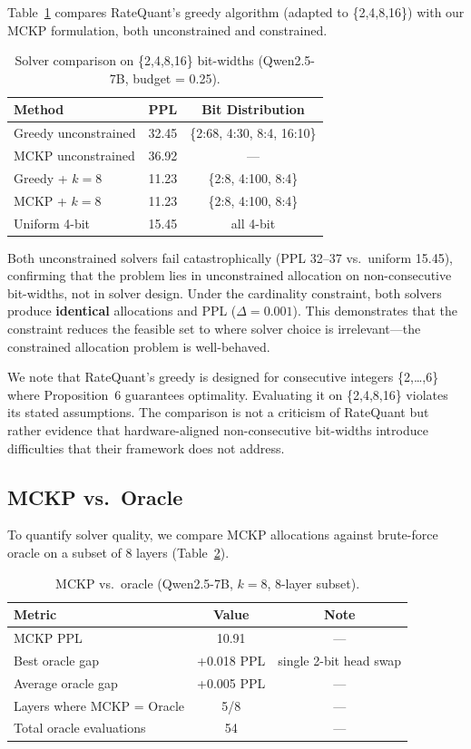 \documentclass[11pt,a4paper]{article}
\begin{document}
Table~\ref{tab:solver} compares RateQuant's greedy algorithm (adapted to \{2,4,8,16\}) with our MCKP formulation, both unconstrained and constrained.

\begin{table}[h]
\centering
\caption{Solver comparison on \{2,4,8,16\} bit-widths (Qwen2.5-7B, budget = 0.25).}
\label{tab:solver}
\small
\begin{tabular}{lcc}
\toprule
Method & PPL & Bit Distribution \\
\midrule
Greedy unconstrained & 32.45 & \{2:68, 4:30, 8:4, 16:10\} \\
MCKP unconstrained & 36.92 & --- \\
\midrule
Greedy + $k\!=\!8$ & 11.23 & \{2:8, 4:100, 8:4\} \\
MCKP + $k\!=\!8$ & 11.23 & \{2:8, 4:100, 8:4\} \\
\midrule
Uniform 4-bit & 15.45 & all 4-bit \\
\bottomrule
\end{tabular}
\end{table}

Both unconstrained solvers fail catastrophically (PPL 32--37 vs.\ uniform 15.45), confirming that the problem lies in unconstrained allocation on non-consecutive bit-widths, not in solver design.
Under the cardinality constraint, both solvers produce \textbf{identical} allocations and PPL ($\Delta = 0.001$).
This demonstrates that the constraint reduces the feasible set to where solver choice is irrelevant---the constrained allocation problem is well-behaved.

We note that RateQuant's greedy is designed for consecutive integers \{2,\ldots,6\} where Proposition~6 guarantees optimality.
Evaluating it on \{2,4,8,16\} violates its stated assumptions.
The comparison is not a criticism of RateQuant but rather evidence that hardware-aligned non-consecutive bit-widths introduce difficulties that their framework does not address.

\subsection{MCKP vs.\ Oracle}

To quantify solver quality, we compare MCKP allocations against brute-force oracle on a subset of 8 layers (Table~\ref{tab:oracle}).

\begin{table}[h]
\centering
\caption{MCKP vs.\ oracle (Qwen2.5-7B, $k\!=\!8$, 8-layer subset).}
\label{tab:oracle}
\small
\begin{tabular}{lcc}
\toprule
Metric & Value & Note \\
\midrule
MCKP PPL & 10.91 & --- \\
Best oracle gap & +0.018 PPL & single 2-bit head swap \\
Average oracle gap & +0.005 PPL & --- \\
Layers where MCKP = Oracle & 5/8 & --- \\
Total oracle evaluations & 54 & --- \\
\bottomrule
\end{tabular}
\end{table}
\end{document}
